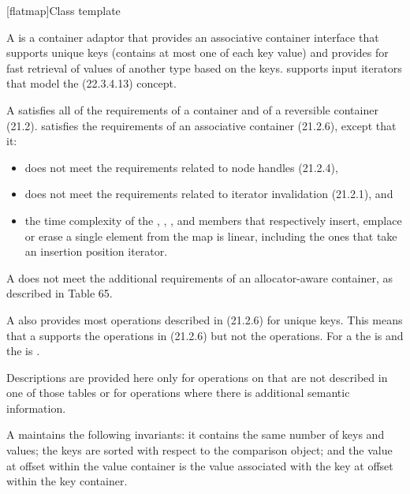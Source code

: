 \noindent\makebox[\linewidth]{\rule{\textwidth}{0.4pt}}

\setcounter{subsection}{7}
\begin{addedblock}
[flatmap]{Class template }

\pnum
{}%
A  is a container adaptor that provides an associative
container interface that supports unique keys (contains at most one of each
key value) and provides for fast retrieval of values of another type 
based on the keys.  supports input iterators that model
the  (22.3.4.13) concept.

\pnum
A  satisfies all of the requirements of a container and of a
reversible container (21.2).   satisfies
the requirements of an associative container (21.2.6), except
that it:
\begin{itemize}
\item does not meet the requirements related to node handles (21.2.4),
\item does not meet the requirements related to iterator invalidation (21.2.1), and
\item the time complexity of the , , ,
and  members that respectively insert, emplace or erase a single
element from the map is linear, including the ones that take an insertion
position iterator.
\end{itemize}
A  does not meet the additional requirements of an
allocator-aware container, as described in Table 65.

\pnum
A  also provides most operations described
in (21.2.6) for unique keys.  This means that a
 supports the  operations
in (21.2.6) but not the  operations.  For
a  the  is  and the
 is .

\pnum
Descriptions are provided here only for operations on  that
are not described in one of those tables or for operations where there is
additional semantic information.

\pnum
A  maintains the following invariants: it contains the same
number of keys and values; the keys are sorted with respect to the comparison
object; and the value at offset  within the value container is the
value associated with the key at offset  within the key container.


\end{addedblock}
